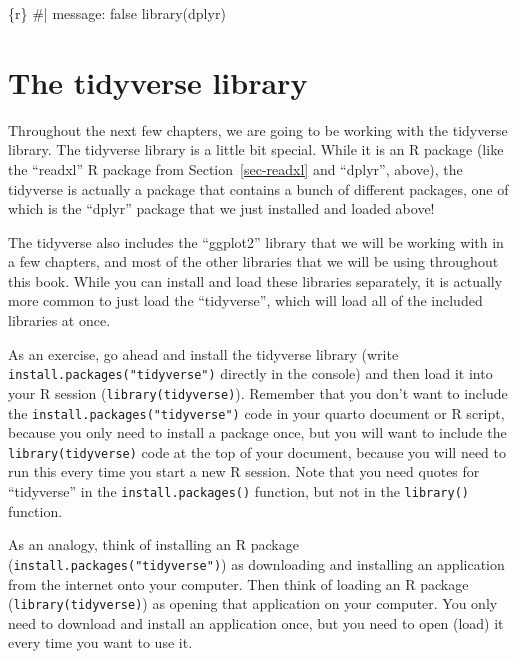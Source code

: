 \documentclass[
  letterpaper,
  DIV=11,
  numbers=noendperiod]{scrreprt}
\newenvironment{Shaded}{\begin{snugshade}}{\end{snugshade}}
\newcommand{\InformationTok}[1]{\textcolor[rgb]{0.37,0.37,0.37}{#1}}
\begin{document}
\begin{Shaded}
\begin{Highlighting}[]
\InformationTok{\textasciigrave{}\textasciigrave{}\textasciigrave{}\{r\}}
\InformationTok{\#| message: false}
\InformationTok{library(dplyr)}
\InformationTok{\textasciigrave{}\textasciigrave{}\textasciigrave{}}
\end{Highlighting}
\end{Shaded}

\section{The tidyverse library}\label{the-tidyverse-library}

Throughout the next few chapters, we are going to be working with the
tidyverse library. The tidyverse library is a little bit special. While
it is an R package (like the ``readxl'' R package from
Section~\ref{sec-readxl} and ``dplyr'', above), the tidyverse is
actually a package that contains a bunch of different packages, one of
which is the ``dplyr'' package that we just installed and loaded above!

The tidyverse also includes the ``ggplot2'' library that we will be
working with in a few chapters, and most of the other libraries that we
will be using throughout this book. While you can install and load these
libraries separately, it is actually more common to just load the
``tidyverse'', which will load all of the included libraries at once.

As an exercise, go ahead and install the tidyverse library (write
\texttt{install.packages("tidyverse")} directly in the console) and then
load it into your R session (\texttt{library(tidyverse)}). Remember that
you don't want to include the \texttt{install.packages("tidyverse")}
code in your quarto document or R script, because you only need to
install a package once, but you will want to include the
\texttt{library(tidyverse)} code at the top of your document, because
you will need to run this every time you start a new R session. Note
that you need quotes for ``tidyverse'' in the
\texttt{install.packages()} function, but not in the \texttt{library()}
function.

As an analogy, think of installing an R package
(\texttt{install.packages("tidyverse")}) as downloading and installing
an application from the internet onto your computer. Then think of
loading an R package (\texttt{library(tidyverse)}) as opening that
application on your computer. You only need to download and install an
application once, but you need to open (load) it every time you want to
use it.
\end{document}
